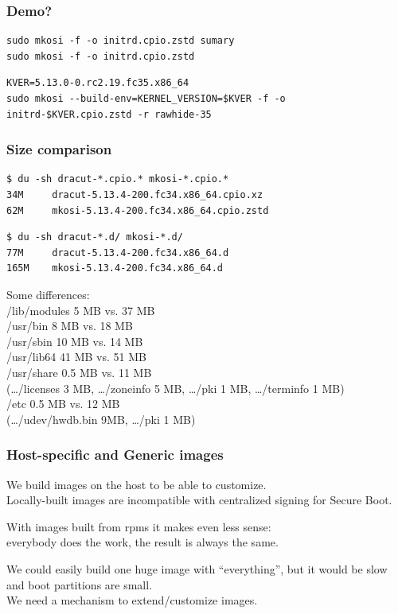 \documentclass[]{beamer}
\begin{document}
\begin{frame}[fragile]
  \frametitle{Demo?}

  \begin{verbatim}
sudo mkosi -f -o initrd.cpio.zstd sumary
sudo mkosi -f -o initrd.cpio.zstd
  \end{verbatim}

  \bigskip
  \pause

  \begin{verbatim}
KVER=5.13.0-0.rc2.19.fc35.x86_64
sudo mkosi --build-env=KERNEL_VERSION=$KVER -f -o initrd-$KVER.cpio.zstd -r rawhide-35
  \end{verbatim}
\end{frame}

\begin{frame}[fragile]
  \frametitle{Size comparison}

  \begin{verbatim}
$ du -sh dracut-*.cpio.* mkosi-*.cpio.*
34M     dracut-5.13.4-200.fc34.x86_64.cpio.xz
62M     mkosi-5.13.4-200.fc34.x86_64.cpio.zstd
  \end{verbatim}
  \pause
  \begin{verbatim}
$ du -sh dracut-*.d/ mkosi-*.d/
77M     dracut-5.13.4-200.fc34.x86_64.d
165M    mkosi-5.13.4-200.fc34.x86_64.d
  \end{verbatim}

  \pause
  \bigskip

  Some differences:\\
  /lib/modules  5 MB vs. 37 MB\\
  /usr/bin      8 MB vs. 18 MB\\
  /usr/sbin    10 MB vs. 14 MB\\
  /usr/lib64   41 MB vs. 51 MB\\
  /usr/share    0.5 MB vs. 11 MB\\
  (…/licenses 3 MB, …/zoneinfo 5 MB, …/pki 1 MB, …/terminfo 1 MB)\\
  /etc          0.5 MB vs. 12 MB\\
  (…/udev/hwdb.bin 9MB, …/pki 1 MB)

\end{frame}

\begin{frame}
  \frametitle{Host-specific and Generic images}

  We build images on the host to be able to customize.\\
  Locally-built images are incompatible with centralized signing for Secure Boot.

  \bigskip
  \pause

  With images built from rpms it makes even less sense:\\
  everybody does the work, the result is always the same.

  \bigskip
  \pause

  We could easily build one huge image with ``everything'', but
  it would be slow and boot partitions are small.\\

  We need a mechanism to extend/customize images.
\end{frame}
\end{document}
